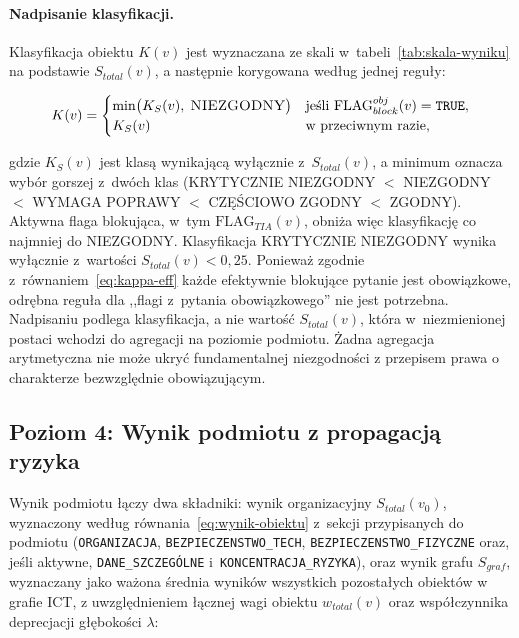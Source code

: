 \paragraph{Nadpisanie klasyfikacji.}
Klasyfikacja obiektu $K(v)$ jest wyznaczana ze skali
w~tabeli~\ref{tab:skala-wyniku} na podstawie $S_{total}(v)$,
a następnie korygowana według jednej reguły:

\begin{equation}
K(v) =
\begin{cases}
\min\bigl(K_S(v),\; \textsc{NIEZGODNY}\bigr)
  & \text{jeśli } \text{FLAG}_{block}^{obj}(v) = \texttt{TRUE}, \\
K_S(v) & \text{w~przeciwnym razie,}
\end{cases}
\label{eq:klasa-obiektu}
\end{equation}

\noindent gdzie $K_S(v)$ jest klasą wynikającą wyłącznie z~$S_{total}(v)$,
a minimum oznacza wybór gorszej z~dwóch klas
(\textsc{KRYTYCZNIE NIEZGODNY} $<$ \textsc{NIEZGODNY} $<$
\textsc{WYMAGA POPRAWY} $<$ \textsc{CZĘŚCIOWO ZGODNY} $<$ \textsc{ZGODNY}).
Aktywna flaga blokująca, w~tym $\text{FLAG}_{TIA}(v)$, obniża więc
klasyfikację co najmniej do \textsc{NIEZGODNY}. Klasyfikacja
\textsc{KRYTYCZNIE NIEZGODNY} wynika wyłącznie z~wartości
$S_{total}(v) < 0{,}25$. Ponieważ zgodnie z~równaniem~\eqref{eq:kappa-eff}
każde efektywnie blokujące pytanie jest obowiązkowe, odrębna reguła
dla ,,flagi z~pytania obowiązkowego'' nie jest potrzebna.
Nadpisaniu podlega klasyfikacja, a nie wartość $S_{total}(v)$, która
w~niezmienionej postaci wchodzi do agregacji na poziomie podmiotu.
Żadna agregacja arytmetyczna nie może ukryć
fundamentalnej niezgodności z przepisem prawa
o charakterze bezwzględnie obowiązującym.



\subsection{Poziom 4: Wynik podmiotu
            z propagacją ryzyka}
\label{sec:wynik-podmiotu}

Wynik podmiotu łączy dwa składniki: wynik organizacyjny
$S_{total}(v_0)$, wyznaczony według równania~\eqref{eq:wynik-obiektu}
z~sekcji przypisanych do podmiotu (\texttt{ORGANIZACJA},
\texttt{BEZPIECZENSTWO\_TECH}, \texttt{BEZPIECZENSTWO\_FIZYCZNE}
oraz, jeśli aktywne, \texttt{DANE\_SZCZEGÓLNE}
i~\texttt{KONCENTRACJA\_RYZYKA}), oraz wynik grafu $S_{graf}$,
wyznaczany jako ważona średnia wyników wszystkich pozostałych
obiektów w grafie ICT, z uwzględnieniem łącznej wagi obiektu
$w_{total}(v)$ oraz współczynnika deprecjacji
głębokości $\lambda$:

